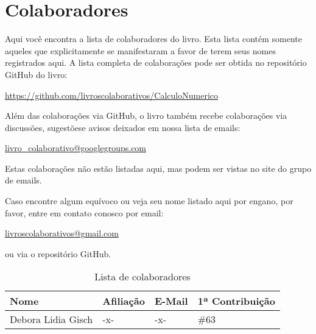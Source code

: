 
%
%
%

\chapter*{Colaboradores}

Aqui você encontra a lista de colaboradores do livro. Esta lista contém somente aqueles que explicitamente se manifestaram a favor de terem seus nomes registrados aqui. A lista completa de colaborações pode ser obtida no repositório GitHub do livro:
\begin{center}
  \url{https://github.com/livroscolaborativos/CalculoNumerico}
\end{center}
Além das colaborações via GitHub, o livro também recebe colaborações via discussões, sugestõese avisos deixados em nossa lista de emails:
\begin{center}
\url{livro_colaborativo@googlegroups.com}  
\end{center}
Estas colaborações não estão listadas aqui, mas podem ser vistas no site do grupo de emails.

Caso encontre algum equívoco ou veja seu nome listado aqui por engano, por favor, entre em contato conosco por email:
\begin{center}
  \url{livroscolaborativos@gmail.com}
\end{center}
ou via o repositório GitHub.

\begin{table}[h!]
  \centering
  \caption{Lista de colaboradores}
  \label{tab:colaboradores}
  \begin{tabular}{llll} \hline
    Nome & Afiliação & E-Mail & 1ª Contribuição\\ \hline
    Debora Lidia Gisch & -x- & -x- & \#63 \\
    \hline
  \end{tabular}
\end{table}

